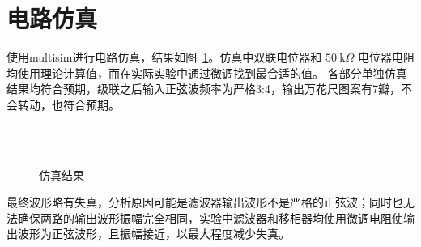 \documentclass[utf8,twocolumn]{article}
\begin{document}
\section{电路仿真}
使用multisim进行电路仿真，结果如图~\ref{plot:multi-1}。仿真中双联电位器和 $ 50~\mathrm{k}\Omega $ 电位器电阻均使用理论计算值，而在实际实验中通过微调找到最合适的值。
各部分单独仿真结果均符合预期，级联之后输入正弦波频率为严格3:4，输出万花尺图案有7瓣，不会转动，也符合预期。
\begin{figure}[H]
    \centering
    \quad
    \\
    \\
    \quad
    \caption{仿真结果}
    \label{plot:multi-1}
\end{figure}
最终波形略有失真，分析原因可能是滤波器输出波形不是严格的正弦波；同时也无法确保两路的输出波形振幅完全相同，实验中滤波器和移相器均使用微调电阻使输出波形为正弦波形，且振幅接近，以最大程度减少失真。
\end{document}
